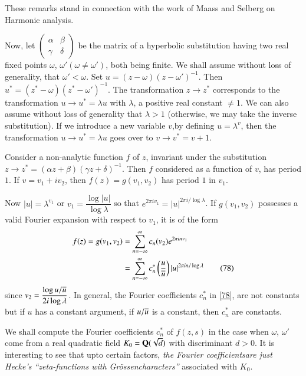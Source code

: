 These remarks stand in connection with the work of Maass and Selberg
on Harmonic analysis.

Now, let $\left(\begin{smallmatrix} \alpha & \beta\\ \gamma & \delta
\end{smallmatrix}\right)$ be the matrix of a hyperbolic substitution
having two real fixed points $\omega$, $\omega'(\omega\neq \omega')$,
both being finite. We shall assume without loss of generality, that
$\omega'<\omega$. Set $u=(z-\omega)(z-\omega')^{-1}$. Then
$u^{\ast}=(z^{\ast}-\omega)(z^{\ast}-\omega')^{-1}$. The
transformation $z\to z^{\ast}$ corresponds to the transformation $u\to
u^{\ast}=\lambda u$ with $\lambda$, a positive real constant $\neq
1$. We can also assume without loss of generality that $\lambda>1$
(otherwise, we may take the inverse substitution). If we introduce a
new variable $v$,by defining $u=\lambda^{v}$, then the transformation
$u\to u^{\ast}=\lambda u$ goes over to $v\to v^{\ast}=v+1$.

Consider a non-analytic function $f$ of $z$, invariant under the
substitution $z\to z^{\ast}=(\alpha z+\beta)(\gamma
z+\delta)^{-1}$. Then $f$ considered as a function of $v$, has period
$1$. If $v=v_{1}+iv_{2}$, then $f(z)=g(v_{1},v_{2})$ has period $1$ in
$v_{1}$.

Now $|u|=\lambda^{v_{1}}$ or $v_{1}=\dfrac{\log|u|}{\log\lambda}$ so
that $e^{2\pi iv_{1}}=|u|^{2\pi i/\log\lambda}$. If $g(v_{1},v_{2})$
possesses a valid Fourier expansion with respect to $v_{1}$, it is of
the form
\begin{align*}
f(z)=g(v_{1},v_{2}) &= \sum^{\infty}_{n=-\infty}c_{n}(v_{2})e^{2\pi
  inv_{1}}\\
&=
\sum^{\infty}_{n=-\infty}c^{\ast}_{n}\left(\frac{u}{\overline{u}}\right)|u|^{2\pi
  in/\log\lambda}\tag{78}\label{78} 
\end{align*}
since $v_{2}=\dfrac{\log u/\overline{u}}{2i\log \lambda}$. In general, the
Fourier coefficients $c^{\ast}_{n}$ in \eqref{78}, are not constants
but if $u$ has a constant argument, \ie if $u/\overline{u}$ is a constant,
then $c^{\ast}_{n}$ are constants.

We shall compute the Fourier coefficients $c^{\ast}_{n}$ of $f(z,s)$
in the case when $\omega$, $\omega'$ come from a real quadratic field
$K_{0}=\mathbf{Q}(\sqrt{d})$ with discriminant $d>0$. It is interesting to
see that upto certain factors, {\em the Fourier
  coefficients\pageoriginale are just 
  Hecke's ``zeta-functions with Gr\"ossencharacters''} associated with
$K_{0}$.

